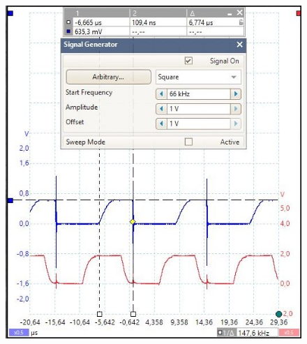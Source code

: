 \begin{figure}[H]
\begin{minipage}{.399\linewidth}
		\label{fig:pwr_led_36k}
	\end{minipage}
\end{figure}

\begin{figure}[H]
	\centering
	\begin{minipage}{.4\linewidth}
		\centering
		\includegraphics[width=\textwidth]{figures/results/power_led_driver/66khz_crop.JPG}
		\label{fig:pwr_led_66k}
	\end{minipage}
	\hspace{.1\linewidth}
	\begin{minipage}{.4\linewidth}
		\centering

\end{minipage}
\end{figure}
